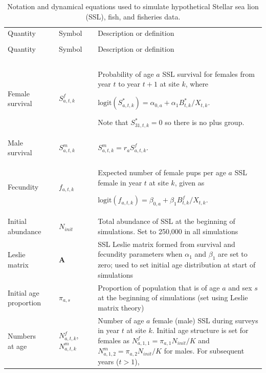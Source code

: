 \documentclass[nonumbib,leqno]{nrc1}
\begin{document}


\begin{longtable}{p{4cm}lll p{8cm}}
\caption[Population \& Fisheries dynamics]{\large Notation and dynamical equations used to simulate
 hypothetical Stellar sea lion (SSL), fish, and fisheries data.} \label{tab:model} \\
\hline \hline
Quantity & & Symbol & & Description or definition \\
\cline{1-1} \cline{3-3} \cline{5-5} \\
\endfirsthead
\hline \hline
Quantity & & Symbol & & Description or definition \\
\cline{1-1} \cline{3-3} \cline{5-5} \\
\endhead
\hline
\endfoot
\hline
\endlastfoot
\multicolumn{1}{l}{\textbf{Stellar sea lion dynamics}}\\
Female survival & & $S_{a,t,k}^f$ & & Probability of age $a$ SSL survival for females from year $t$ to year $t+1$ at site $k$, where

$\textrm{logit}(S_{a,t,k}^*)=\alpha_{0,a}+\alpha_1 B_{t,k}^*/X_{t,k}$.

Note that $S_{31,t,k}^*=0$ so there is no plus group.\\
Male survival & & $S_{a,t,k}^{m}$ & & $S_{a,t,k}^{m}=r_a S_{a,t,k}^f$.  \\
Fecundity & & $f_{a,t,k}$ & & Expected number of female pups per age $a$ SSL female in year $t$ at site $k$,
given as

$\textrm{logit}(f_{a,t,k})=\beta_{0,a}+\beta_1 B_{t,k}^f/X_{t,k}$. \\
Initial abundance & & $N_{init}$ & & Total abundance of SSL at the beginning of simulations.  Set to 250,000 in all simulations \\
Leslie matrix & & $\textbf{A}$ & & SSL Leslie matrix formed from survival and fecundity parameters when $\alpha_1$ and $\beta_1$ are set to zero; used to set initial age distribution at start of simulations \\
Initial age proportion & & $\pi_{a,s}$ & & Proportion of population that is of age $a$ and sex $s$ at the beginning of simulations (set using Leslie matrix theory) \\
Numbers at age & & $N_{a,t,k}^f$,$N_{a,t,k}^{m}$ & & Number of age $a$ female (male) SSL during surveys in year $t$ at site $k$.  Initial age structure is set for females as $N_{a,1,1}^f=\pi_{a,1}N_{init}/K $ and $N_{a,1,2}^m=\pi_{a,2}N_{init}/K $ for males.  For subsequent years ($t>1$),


\end{longtable}
\end{document}
